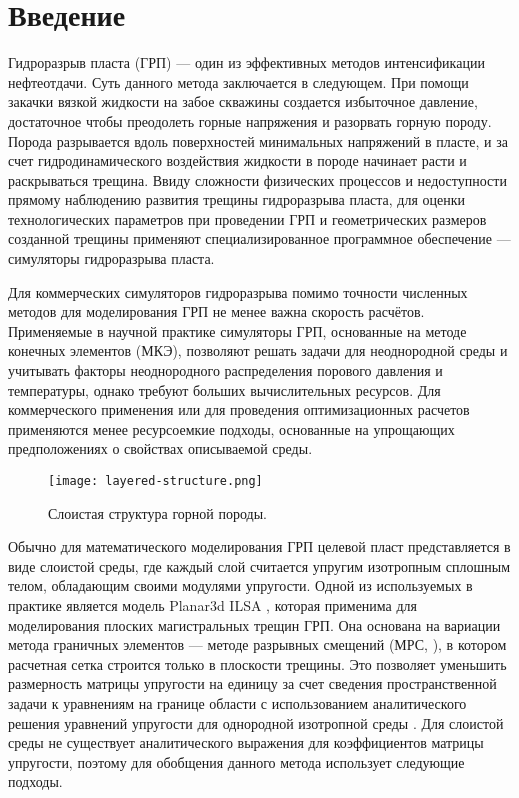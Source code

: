\chapter*{Введение}                         %

Гидроразрыв пласта (ГРП) — один из эффективных методов интенсификации нефтеотдачи. Суть данного метода заключается в следующем. При помощи закачки вязкой жидкости на забое скважины создается избыточное давление, достаточное чтобы преодолеть горные напряжения и разорвать горную породу. Порода разрывается вдоль поверхностей минимальных напряжений в пласте, и за счет гидродинамического воздействия жидкости в породе начинает расти и раскрываться трещина. Ввиду сложности физических процессов и недоступности прямому наблюдению развития трещины гидроразрыва пласта, для оценки технологических параметров при проведении ГРП и геометрических размеров созданной трещины применяют специализированное программное обеспечение — симуляторы гидроразрыва пласта.

Для коммерческих симуляторов гидроразрыва помимо точности численных методов для моделирования ГРП не менее важна скорость расчётов. Применяемые в научной практике симуляторы ГРП, основанные на методе конечных элементов (МКЭ), позволяют решать задачи для неоднородной среды и учитывать факторы неоднородного распределения порового давления и температуры, однако требуют больших вычислительных ресурсов. Для коммерческого применения или для проведения оптимизационных расчетов применяются менее ресурсоемкие подходы, основанные на упрощающих предположениях о свойствах описываемой среды.

\begin{figure}[htbp]
    \centering
    \texttt{[image: layered-structure.png]}
    \caption{Слоистая структура горной породы.}
\end{figure}

Обычно для математического моделирования ГРП целевой пласт представляется в виде слоистой среды, где каждый слой считается упругим изотропным сплошным телом, обладающим своими модулями упругости. Одной из используемых в практике является модель Planar3d ILSA \cite{DONTSOV201753}, которая применима для моделирования плоских магистральных трещин ГРП. Она основана на вариации метода граничных элементов --- методе разрывных смещений (МРС, \cite{dispalecement_discontinuty_Crouch1983}), в котором расчетная сетка строится только в плоскости трещины. Это позволяет уменьшить размерность матрицы упругости на единицу за счет сведения пространственной задачи к уравнениям на границе области с использованием аналитического решения уравнений упругости для однородной изотропной среды \cite{Peir2008}. Для слоистой среды не существует аналитического выражения для коэффициентов матрицы упругости, поэтому для обобщения данного метода использует следующие подходы.

